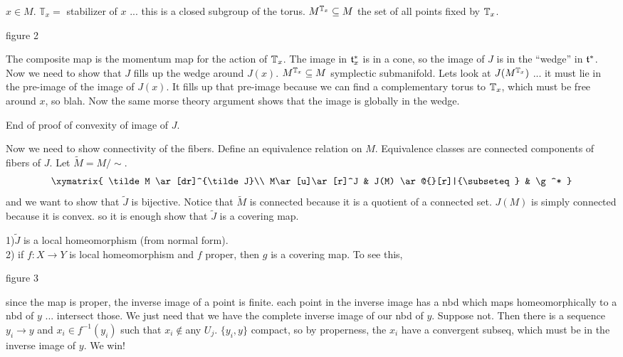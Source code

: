  $x\in M$.  $\mathbb{T}_x=$ stabilizer of $x$ ... this is a closed subgroup of the
 torus. $M^{\mathbb{T}_x}\subseteq M$ the set of all points fixed by $\mathbb{T}_x$.

 figure 2

 The composite map is the momentum map for the action of $\mathbb{T}_x$.  The image in
 $\mathfrak{t}_x^*$ is in a cone, so the image of $J$ is in the ``wedge'' in $\mathfrak{t}^*$.  Now we
 need to show that $J$ fills up the wedge around $J(x)$.  $M^{\mathbb{T}_x}\subseteq M$
 symplectic submanifold.  Lets look at $J(M^{\mathbb{T}_x})$ ... it must lie in the pre-image
 of the image of $J(x)$.  It fills up that pre-image because we can find a
 complementary torus to $\mathbb{T}_x$, which must be free around $x$, so blah.  Now the same
 morse theory argument shows that the image is globally in the wedge.

 End of proof of convexity of image of $J$.

 Now we need to show connectivity of the fibers. Define an equivalence relation on
 $M$.  Equivalence classes are connected components of fibers of $J$. Let $\tilde
 M=M/\sim$.
 \[\xymatrix{
 \tilde M  \ar[dr]^{\tilde J}\\
 M\ar[u]\ar[r]^J & J(M) \ar@{}[r]|{\subseteq} & \g^*
 }\]
 and we want to show that $\tilde J$ is bijective.  Notice that $\tilde M$ is
 connected because it is a quotient of a connected set.  $J(M)$ is simply connected
 because it is convex. so it is enough show that $\tilde J$ is a covering map.

 1)$\tilde J$ is a local homeomorphism (from normal form).\\
 2) if $f:X\to Y$ is local homeomorphism and $f$ proper, then $g$ is a covering map.
To see this,

 figure 3

 since the map is proper, the inverse image of a point is finite.  each point in the
 inverse image has a nbd which maps homeomorphically to a nbd of $y$ ... intersect
 those.  We just need that we have the complete inverse image of our nbd of $y$.
 Suppose not.  Then there is a sequence $y_i\to y$ and $x_i\in f^{-1}(y_i)$ such that
 $x_i\not\in $any $U_j$.  $\{y_i,y\}$ compact, so by properness, the $x_i$ have a
 convergent subseq, which must be in the inverse image of $y$.  We win!
